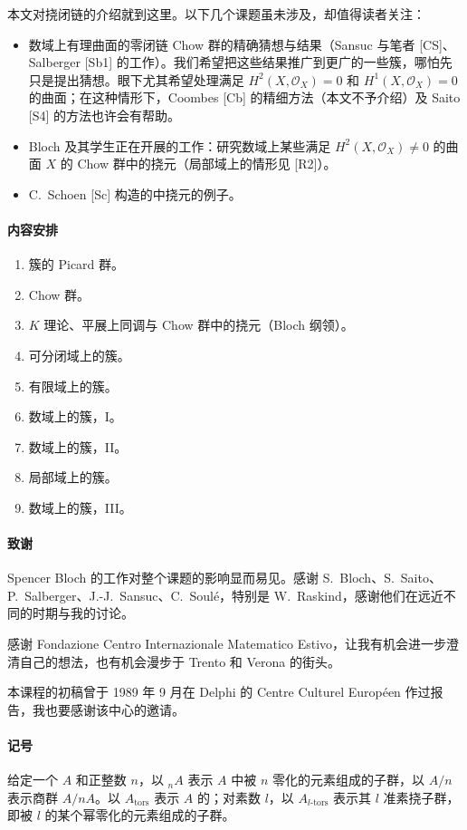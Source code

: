 本文对挠闭链的介绍就到这里。以下几个课题虽未涉及，却值得读者关注：
\begin{itemize}
\item 数域上有理曲面的零闭链 Chow 群的精确猜想与结果（Sansuc 与笔者 [CS]、Salberger [Sb1] 的工作）。我们希望把这些结果推广到更广的一些簇，哪怕先只是提出猜想。眼下尤其希望处理满足
$H^2(X,\mathcal O_X)=0$ 和 $H^1(X,\mathcal O_X)=0$ 的曲面；在这种情形下，Coombes [Cb] 的精细方法（本文不予介绍）及 Saito [S4] 的方法也许会有帮助。
\item Bloch 及其学生正在开展的工作：研究数域上某些满足 $H^2(X,\mathcal O_X)\ne0$ 的曲面 $X$ 的 Chow 群中的挠元（局部域上的情形见 [R2]）。
\item C.~Schoen [Sc] 构造的中挠元的例子。
\end{itemize}

\paragraph{内容安排}
\begin{enumerate}[label=\S\arabic*.]
\item 簇的 Picard 群。
\item Chow 群。
\item $K$ 理论、平展上同调与 Chow 群中的挠元（Bloch 纲领）。
\item 可分闭域上的簇。
\item 有限域上的簇。
\item 数域上的簇，I。
\item 数域上的簇，II。
\item 局部域上的簇。
\item 数域上的簇，III。
\end{enumerate}

\paragraph{致谢}
Spencer Bloch 的工作对整个课题的影响显而易见。感谢 S.~Bloch、S.~Saito、P.~Salberger、J.-J.~Sansuc、C.~Soulé，特别是 W.~Raskind，感谢他们在远近不同的时期与我的讨论。

感谢 Fondazione Centro Internazionale Matematico Estivo，让我有机会进一步澄清自己的想法，也有机会漫步于 Trento 和 Verona 的街头。

本课程的初稿曾于 1989 年 9 月在 Delphi 的 Centre Culturel Européen 作过报告，我也要感谢该中心的邀请。

\paragraph{记号}
给定一个 $A$ 和正整数 $n$，以 ${}_nA$ 表示 $A$ 中被 $n$ 零化的元素组成的子群，以 $A/n$ 表示商群 $A/nA$。以 $A_{\mathrm{tors}}$ 表示 $A$ 的；对素数 $l$，以 $A_{l\text{-}\mathrm{tors}}$ 表示其 $l$ 准素挠子群，即被 $l$ 的某个幂零化的元素组成的子群。

